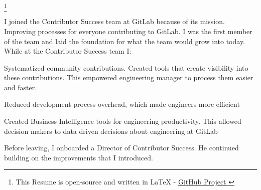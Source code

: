 \documentclass[]{matija-resume}
\begin{document}
\footnote{This Resume is open-source and written in LaTeX - \href{https://github.com/matteeyah/resume}{GitHub Project \faExternalLink}}

\begin{minipage}[t]{1.0\textwidth}

\vspace{\topsep}
I joined the Contributor Success team at GitLab because of its mission. Improving processes for everyone contributing to GitLab. I was the first member of the team and laid the foundation for what the team would grow into today.\\
\vspace{\topsep}
While at the Contributor Success team I:\\
\vspace{\topsep}
\begin{tightemize}
\item Systematized community contributions. Created tools that create visibility into these contributions. This empowered engineering manager to process them easier and faster.
\item Reduced development process overhead, which made engineers more efficient
\item Created Business Intelligence tools for engineering productivity. This allowed decision makers to data driven decisions about engineering at GitLab
\end{tightemize}
\vspace{\topsep}
Before leaving, I onboarded a Director of Contributor Success. He continued building on the improvements that I introduced.
\sectionsep


\end{minipage}
\end{document}
